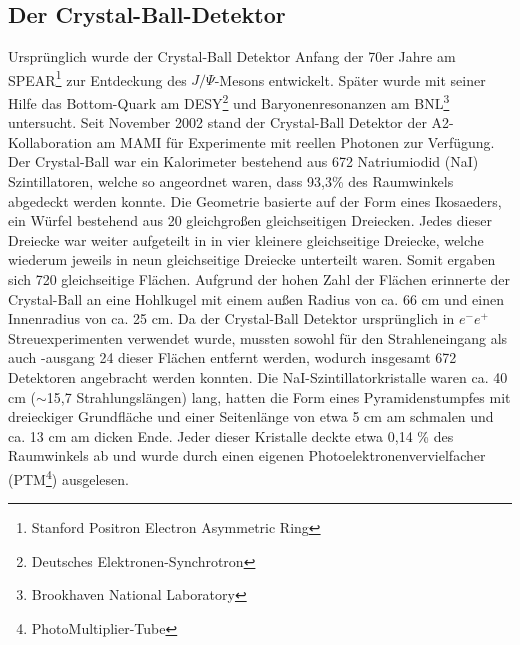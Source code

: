\documentclass[a4paper,11pt,oneside,final,german,openbib,pdftex]{scrbook}
\begin{document}
{\subsection{Der Crystal-Ball-Detektor}
Ursprünglich wurde der Crystal-Ball Detektor Anfang der 70er Jahre am SPEAR\footnote{Stanford Positron Electron Asymmetric Ring} zur Entdeckung des $J/\Psi$-Mesons entwickelt. Später wurde mit seiner Hilfe das Bottom-Quark am DESY\footnote{Deutsches Elektronen-Synchrotron} und Baryonenresonanzen am BNL\footnote{Brookhaven National Laboratory} untersucht.
Seit November 2002 stand der Crystal-Ball Detektor der A2-Kollaboration am MAMI für Experimente mit reellen Photonen zur Verfügung.
\newline
Der Crystal-Ball war ein Kalorimeter bestehend aus 672 Natriumiodid (NaI) Szintillatoren, welche so angeordnet waren, dass 93,3\% des Raumwinkels abgedeckt werden konnte. 
Die Geometrie basierte auf der Form eines Ikosaeders, ein W\"urfel bestehend aus 20 gleichgro{\ss}en  gleichseitigen Dreiecken. Jedes dieser Dreiecke war weiter aufgeteilt in in vier kleinere gleichseitige Dreiecke, welche wiederum jeweils in neun gleichseitige Dreiecke unterteilt waren. Somit ergaben sich 720 gleichseitige Fl\"achen. Aufgrund der hohen Zahl der Fl\"achen erinnerte der Crystal-Ball an eine Hohlkugel mit einem au{\ss}en Radius von ca. 66 cm und einen Innenradius von ca. 25 cm. Da der Crystal-Ball Detektor urspr\"unglich in $e^-e^+$ Streuexperimenten verwendet wurde, mussten sowohl f\"ur den Strahleneingang als auch -ausgang 24 dieser Fl\"achen entfernt werden, wodurch insgesamt 672 Detektoren angebracht werden konnten. Die NaI-Szintillatorkristalle waren ca. 40 cm ($\sim$15,7 Strahlungsl\"angen) lang, hatten die Form eines Pyramidenstumpfes mit dreieckiger Grundfl\"ache und einer Seitenl\"ange von etwa 5 cm am schmalen und ca. 13 cm am dicken Ende. Jeder dieser Kristalle deckte etwa 0,14 \% des Raumwinkels ab und wurde durch einen eigenen Photoelektronenvervielfacher (PTM\footnote{PhotoMultiplier-Tube}) ausgelesen. 



}
\end{document}
